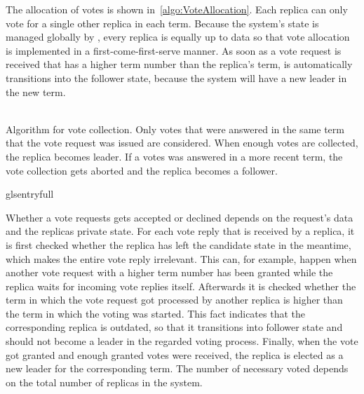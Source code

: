 The allocation of votes is shown in~\autoref{algo:VoteAllocation}.
Each replica can only vote for a single other replica in each term.
Because the system's state is managed globally by , every replica is equally up to data so that vote allocation is implemented in a first-come-first-serve manner.
As soon as a vote request is received that has a higher term number than the replica's term, is automatically transitions into the follower state, because the system will have a new leader in the new term.
\\\\
\begin{algorithm}[H]\caption{Algorithm for vote collection. Only votes that were answered in the same term that the vote request was issued are considered. When enough votes are collected, the replica becomes leader. If a votes was answered in a more recent term, the vote collection gets aborted and the replica becomes a follower.}\label{algo:VoteCollection}

glsentryfull
\BlankLine

\end{algorithm}

Whether a vote requests gets accepted or declined depends on the request's data and the replicas private state.
For each vote reply that is received by a replica, it is first checked whether the replica has left the candidate state in the meantime, which makes the entire vote reply irrelevant.
This can, for example, happen when another vote request with a higher term number has been granted while the replica waits for incoming vote replies itself.
Afterwards it is checked whether the term in which the vote request got processed by another replica is higher than the term in which the voting was started.
This fact indicates that the corresponding replica is outdated, so that it transitions into follower state and should not become a leader in the regarded voting process.
Finally, when the vote got granted and enough granted votes were received, the replica is elected as a new leader for the corresponding term.
The number of necessary voted depends on the total number of replicas in the system.

